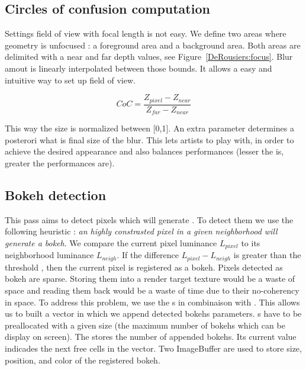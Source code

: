 \subsection{Circles of confusion computation}
Settings field of view with focal length is not easy.
We define two areas where geometry is unfocused : a foreground area and a background area. Both areas are delimited with a near and far depth values, see Figure~\ref{DeRousiers:focus}. Blur amout is linearly interpolated between those bounds. It allows a easy and intuitive way to set up field of view.

$$
	CoC = \frac{Z_{pixel} - Z_{near} }{ Z_{far} - Z_{near} }
$$

This way the \coc size is normalized between [0,1]. An extra parameter  determines a posterori what is final size of the blur. This lets artists to play with, in order to achieve the desired appearance and also balances performances (lesser the  is, greater the performances are).


\subsection{Bokeh detection}
This pass aims to detect pixels which will generate \bokehs. To detect them we use the following heuristic : \emph{an highly constrasted pixel in a given neighborhood will generate a bokeh}. We compare the current pixel luminance $L_{pixel}$ to its neighborhood luminance $L_{neigh}$. If the difference $L_{pixel}-L_{neigh}$ is greater than the threshold , then the current pixel is registered as a bokeh. Pixels detected as bokeh are sparse. Storing them into a render target texture would be a waste of space and reading them back would be a waste of time due to their no-coherency in space. To address this problem, we use the \opengl {}s in combinaison with . This allows us to built a vector in which we append detected bokehs parameters. s have to be preallocated with a given size (\ie the maximum number of bokehs which can be display on screen). The  stores the number of appended bokehs. Its current value indicades the next free cells in the  vector. Two ImageBuffer are used to store \coc size, position, and color of the registered bokeh. 


